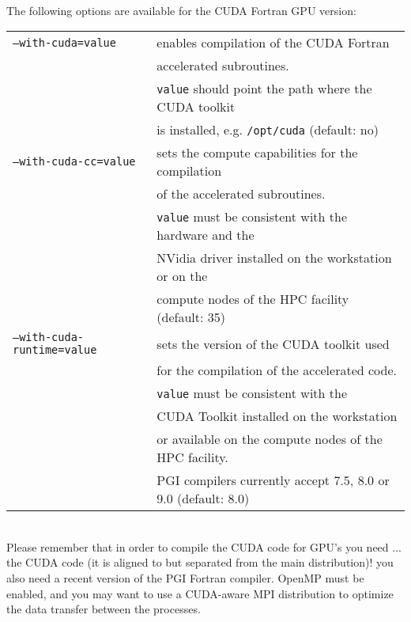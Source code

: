 \documentclass[12pt,a4paper]{article}
\begin{document}
\\
The following options are available for the CUDA Fortran GPU version:\\
\begin{tabular}{ll}
\texttt{--with-cuda=value}&         enables compilation of the CUDA Fortran\\
                          &         accelerated subroutines. \\
                          &         \texttt{value} should point the path where the CUDA toolkit \\
                          &         is installed, e.g. \texttt{/opt/cuda} (default: no)\\
\texttt{--with-cuda-cc=value}&      sets the compute capabilities for the compilation\\
                             &      of the accelerated subroutines. \\
                             &      \texttt{value} must be consistent with the hardware and the\\
                             &      NVidia driver installed on the workstation or on the\\
                             &      compute nodes of the HPC facility (default: 35)\\
\texttt{--with-cuda-runtime=value}& sets the version of the CUDA toolkit used \\
                                  & for the compilation of the accelerated code.\\
                                  & \texttt{value} must be consistent with the\\
                                  & CUDA Toolkit installed on the workstation \\
                                  & or available on the compute nodes of the HPC facility.\\
                                  & PGI compilers currently accept 7.5, 8.0 or 9.0 (default: 8.0)\\
\end{tabular}\\

Please remember that in order to compile the CUDA code for GPU's you need ... 
the CUDA code (it is aligned to but separated from the main distribution)! 
you also need a recent version of the PGI Fortran compiler. 
OpenMP must be enabled,
and you may want to use a CUDA-aware MPI distribution to optimize the data
transfer between the processes.
\end{document}
